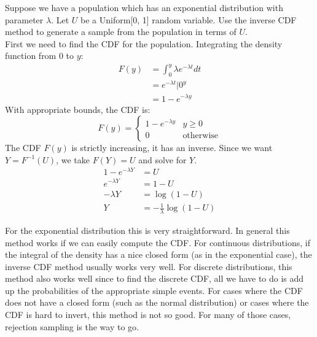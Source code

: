 \documentclass[notes.tex]{subfiles}
\begin{document}
\begin{example}Suppose we have a population which has an exponential distribution with parameter $\lambda$. Let $U$ be a Uniform[0, 1] random variable. Use the inverse CDF method to generate a sample from the population in terms of $U$.\\

First we need to find the CDF for the population. Integrating the density function from 0 to $y$:
\begin{align*}
F(y) &= \int_0^y \lambda e^{-\lambda t} dt \\
&= e^{-\lambda t}\Bigr|0^y \\
&= 1 - e^{-\lambda y}
\end{align*}
With appropriate bounds, the CDF is:
\[
F(y) = \begin{cases}
1 - e^{-\lambda y} & y \geq 0 \\
0 & \text{otherwise}
\end{cases}
\]
The CDF $F(y)$ is strictly increasing, it has an inverse. Since we want $Y = F^{-1}(U)$, we take $F(Y) = U$ and solve for $Y$.
\begin{align*}
1 - e^{-\lambda Y} &= U \\
e^{-\lambda Y} &= 1 - U \\
-\lambda Y &= \log(1 - U) \\
Y &= - \frac{1}{\lambda} \log(1 - U)
\end{align*}
\end{example}
For the exponential distribution this is very straightforward. In general this method works if we can easily compute the CDF. For continuous distributions, if the integral of the density has a nice closed form (as in the exponential case), the inverse CDF method usually works very well. For discrete distributions, this method also works well since to find the discrete CDF, all we have to do is add up the probabilities of the appropriate simple events. For cases where the CDF does not have a closed form (such as the normal distribution) or cases where the CDF is hard to invert, this method is not so good. For many of those cases, rejection sampling is the way to go.
\end{document}
